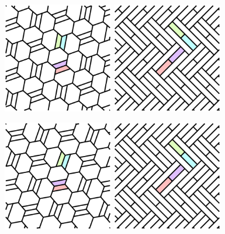 \documentclass{beamer}
\begin{document}
\begin{frame}
  \begin{center}
    \includegraphics[width=1.9in]{c06}
    \includegraphics[width=1.9in]{c12}
  \end{center}
\end{frame}

\begin{frame}
  \begin{center}
    \includegraphics[width=1.9in]{c07}
    \includegraphics[width=1.9in]{c12}
  \end{center}
\end{frame}
\end{document}
